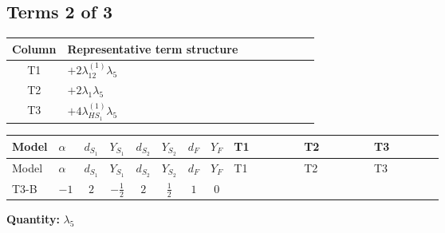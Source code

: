 \documentclass[8pt]{article}
\begin{document}
\begin{landscape}
\subsection*{Terms 2 of 3}
\begin{center}
\begin{tabular}{@{}c >{\raggedright\arraybackslash}p{0.82\linewidth}@{}}
\toprule
Column & Representative term structure \\
\midrule
T1 & \(\displaystyle +2 {\lambda_{12}^{(1)}} {\lambda_5}\) \\
\midrule
T2 & \(\displaystyle +2 {\lambda_1} {\lambda_5}\) \\
\midrule
T3 & \(\displaystyle +4 {\lambda_{HS_1}^{(1)}} {\lambda_5}\) \\
\midrule
\bottomrule
\end{tabular}
\end{center}
\smallskip
\tiny
\begin{longtable}{@{}llcccccc >{\raggedright\arraybackslash}p{0.21\linewidth} >{\raggedright\arraybackslash}p{0.21\linewidth} >{\raggedright\arraybackslash}p{0.21\linewidth}@{}}
\toprule
Model & $\alpha$ & $d_{S_1}$ & $Y_{S_1}$ & $d_{S_2}$ & $Y_{S_2}$ & $d_F$ & $Y_F$ & T1 & T2 & T3 \\
\midrule
\endfirsthead
\toprule
Model & $\alpha$ & $d_{S_1}$ & $Y_{S_1}$ & $d_{S_2}$ & $Y_{S_2}$ & $d_F$ & $Y_F$ & T1 & T2 & T3 \\
\midrule
\endhead
T3-B & $-1$ & $2$ & $-\frac{1}{2}$ & $2$ & $\frac{1}{2}$ & $1$ & $0$ & \scriptsize\adjustbox{max width=\linewidth}{$\begin{gathered} +2 {\lambda_{12}^{(1)}} {\lambda_5}\end{gathered}$} & \scriptsize\adjustbox{max width=\linewidth}{$\begin{gathered} +2 {\lambda_1} {\lambda_5}\end{gathered}$} & \scriptsize\adjustbox{max width=\linewidth}{$\begin{gathered} +4 {\lambda_{HS_1}^{(1)}} {\lambda_5}\end{gathered}$} \\
\midrule
\bottomrule
\end{longtable}
\clearpage
\noindent\textbf{Quantity: }$\lambda_5$\par\smallskip

\end{landscape}
\end{document}
